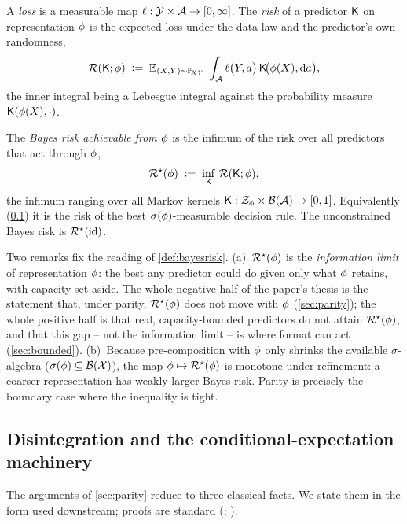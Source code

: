 \begin{definition}
\label{def:risk}
A \emph{loss} is a measurable map $\ell : \mathcal{Y} \times \mathcal{A} \to
[0,\infty]$. The \emph{risk} of a predictor $\mathsf{K}$ on representation
$\phi$ is the expected loss under the data law and the predictor's own
randomness,
\[
  \mathcal{R}(\mathsf{K}; \phi)
  \;\vcentcolon=\;
  \mathbb{E}_{(X,Y)\sim\mathbb{P}_{\!XY}}\;
  \int_{\mathcal{A}} \ell\big(Y, a\big)\,
       \mathsf{K}\!\big(\phi(X), \mathrm{d}a\big),
\]
the inner integral being a Lebesgue integral against the probability measure
$\mathsf{K}(\phi(X),\cdot)$.
\end{definition}

\begin{definition}
\label{def:bayesrisk}
The \emph{Bayes risk achievable from $\phi$} is the infimum of the risk over
all predictors that act through $\phi$,
\[
  \mathcal{R}^{\star}(\phi)
  \;\vcentcolon=\;
  \inf_{\mathsf{K}}\, \mathcal{R}(\mathsf{K}; \phi),
\]
the infimum ranging over all Markov kernels
$\mathsf{K} : \mathcal{Z}_{\phi} \times \mathcal{B}(\mathcal{A}) \to [0,1]$. Equivalently
(\cref{subsec:disint}) it is the risk of the best $\sigma\!\left(\phi\right)$-measurable
decision rule. The unconstrained Bayes risk is $\mathcal{R}^{\star}(\mathrm{id})$.
\end{definition}

Two remarks fix the reading of \cref{def:bayesrisk}. (a)~$\mathcal{R}^{\star}(\phi)$ is
the \emph{information limit} of representation $\phi$: the best any predictor
could do given only what $\phi$ retains, with capacity set aside. The whole
negative half of the paper's thesis is the statement that, under parity,
$\mathcal{R}^{\star}(\phi)$ does not move with $\phi$ (\cref{sec:parity}); the whole
positive half is that real, capacity-bounded predictors do not attain
$\mathcal{R}^{\star}(\phi)$, and that this gap -- not the information limit -- is where
format can act (\cref{sec:bounded}). (b)~Because pre-composition with $\phi$
only shrinks the available $\sigma$-algebra ($\sigma\!\left(\phi\right) \subseteq
\mathcal{B}(\mathcal{X})$), the map $\phi \mapsto \mathcal{R}^{\star}(\phi)$ is monotone under
refinement: a coarser representation has weakly larger Bayes risk. Parity is
precisely the boundary case where the inequality is tight.

\subsection{Disintegration and the conditional-expectation machinery}
\label{subsec:disint}

The arguments of \cref{sec:parity} reduce to three classical facts. We state
them in the form used downstream; proofs are standard
(\citealp[Ch.~3,~6]{folland1999real}; \citealp[Ch.~5--6]{kallenberg2002foundations}).

